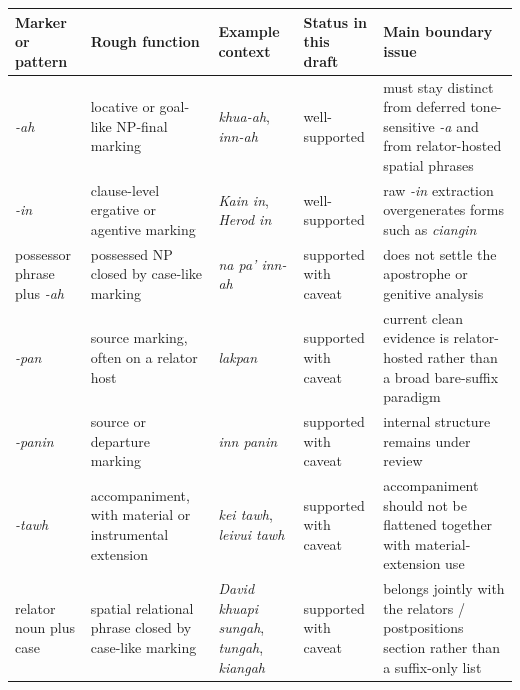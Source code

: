 \documentclass[
  11pt,
  a4paper,
]{article}
\newcounter{none} %
\newcommand{\tdim}[1]{\textit{#1}}
\begin{document}
{\def\LTcaptype{none} %
\begin{longtable}[]{@{}
  >{\raggedright\arraybackslash}p{}
  >{\raggedright\arraybackslash}p{}
  >{\raggedright\arraybackslash}p{}
  >{\raggedright\arraybackslash}p{}
  >{\raggedright\arraybackslash}p{}@{}}
\toprule\noalign{}
\begin{minipage}[b]{\linewidth}\raggedright
Marker or pattern
\end{minipage} & \begin{minipage}[b]{\linewidth}\raggedright
Rough function
\end{minipage} & \begin{minipage}[b]{\linewidth}\raggedright
Example context
\end{minipage} & \begin{minipage}[b]{\linewidth}\raggedright
Status in this draft
\end{minipage} & \begin{minipage}[b]{\linewidth}\raggedright
Main boundary issue
\end{minipage} \\
\midrule\noalign{}
\endhead
\bottomrule\noalign{}
\endlastfoot
\tdim{-ah} & locative or goal-like NP-final marking & \tdim{khua-ah},
\tdim{inn-ah} & well-supported & must stay distinct from deferred
tone-sensitive \tdim{-a} and from relator-hosted spatial phrases \\
\tdim{-in} & clause-level ergative or agentive marking & \tdim{Kain in},
\tdim{Herod in} & well-supported & raw \tdim{-in} extraction
overgenerates forms such as \tdim{ciangin} \\
possessor phrase plus \tdim{-ah} & possessed NP closed by case-like
marking & \tdim{na pa' inn-ah} & supported with caveat & does not settle
the apostrophe or genitive analysis \\
\tdim{-pan} & source marking, often on a relator host & \tdim{lakpan} &
supported with caveat & current clean evidence is relator-hosted rather
than a broad bare-suffix paradigm \\
\tdim{-panin} & source or departure marking & \tdim{inn panin} &
supported with caveat & internal structure remains under review \\
\tdim{-tawh} & accompaniment, with material or instrumental extension &
\tdim{kei tawh}, \tdim{leivui tawh} & supported with caveat &
accompaniment should not be flattened together with material-extension
use \\
relator noun plus case & spatial relational phrase closed by case-like
marking & \tdim{David khuapi sungah}, \tdim{tungah}, \tdim{kiangah} &
supported with caveat & belongs jointly with the relators /
postpositions section rather than a suffix-only list \\
\end{longtable}
}
\end{document}
